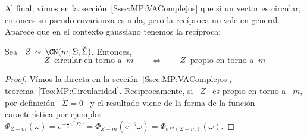 Al final, v\'imos en la  secci\'on~\ref{Ssec:MP:VAComplejos} que si un vector es
circular, entonces su pseudo-covarianza es  nula, pero la rec\'iproca no vale en
general. Aparece que en el contexto gaussiano tenemos la rec\'iproca:
%

\begin{teorema}[Circularidad]\label{Teo:MP:CircularidadGaussiana}
%
Sea \ $Z \, \sim \, \CN(m,\Sigma,\check{\Sigma})$.  Entonces,
  \[
  Z \: \mbox{ circular  en torno a } \: m \qquad  \Longleftrightarrow \qquad Z \:
\mbox{ propio en torno a } \: m
  \]
\end{teorema}
%
\begin{proof}
  V\'imos     la    directa    en     la    secci\'on~\ref{Ssec:MP:VAComplejos},
  teorema~\ref{Teo:MP:Circularidad}.  Reciprocamente,  si \  $Z$ \ es  propio en
  torno a \ $m$, por definici\'on \ $\check{\Sigma} = 0$ \ y el resultado viene
  de la forma de  la funci\'on caracter\'istica por ejemplo: $\Phi_{Z-m}(\omega)
  = e^{-\frac14 \omega^\dag \Sigma \omega } = \Phi_{Z-m}\left( e^{\imath \theta}
    \omega \right) = \Phi_{e^{\imath \theta} (Z-m)}(\omega)$.
\end{proof}



